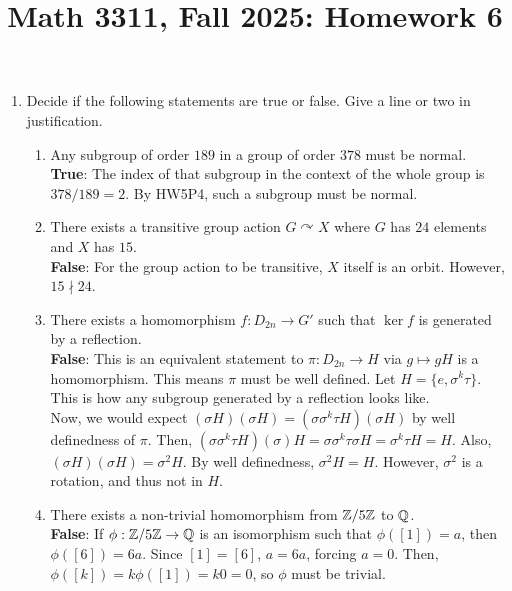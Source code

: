 \documentclass{amsart}
\title{Math 3311, Fall 2025: Homework 6}
\begin{document}
\maketitle

\begin{enumerate}[itemsep=0.2in]

\item Decide if the following statements are true or false. Give a line or two in justification.
\begin{enumerate}
	\item Any subgroup of order $189$ in a group of order $378$ must be normal.\\

    \textbf{True}: The index of that subgroup in the context of the whole group is $378/189=2$. By HW5P4, such a subgroup must be normal.\\
    
	\item There exists a transitive group action $G\curvearrowright X$ where $G$ has $24$ elements and $X$ has $15$.\\

    \textbf{False}: For the group action to be transitive, $X$ itself is an orbit. However, $15\nmid 24$.\\
    
	\item There exists a homomorphism $f:D_{2n}\to G'$ such that $\ker f$ is generated by a reflection.\\

    \textbf{False}: This is an equivalent statement to $\pi:D_{2n}\to H$ via $g\mapsto gH$ is a homomorphism. This means $\pi$ must be well defined. Let $H=\{e,\sigma^k\tau\}$. This is how any subgroup generated by a reflection looks like.\\

    Now, we would expect $(\sigma H)(\sigma H)=(\sigma\sigma^k\tau H)(\sigma H)$ by well definedness of $\pi$. Then, $(\sigma\sigma^k\tau H)(\sigma)H=\sigma\sigma^k\tau\sigma H=\sigma^k\tau H=H$. Also, $(\sigma H)(\sigma H)=\sigma^2H$. By well definedness, $\sigma^2H=H$. However, $\sigma^2$ is a  rotation, and thus not in $H$.\\
    
	\item There exists a non-trivial homomorphism from $\mathbb{Z}/5\mathbb{Z}$ to $\mathbb{Q}$.\\

    \textbf{False}: If $\phi:\mathbb{Z}/5\mathbb{Z}\to\mathbb{Q}$ is an isomorphism such that $\phi([1])=a$, then $\phi([6])=6a$. Since $[1]=[6]$, $a=6a$, forcing $a=0$. Then, $\phi([k])=k\phi([1])=k0=0$, so $\phi$ must be trivial.\\
    

\end{enumerate}
\end{enumerate}
\end{document}
